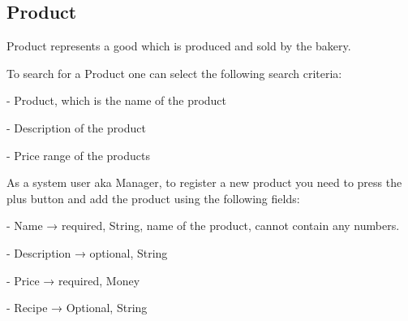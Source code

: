 \subsection{Product}

Product represents a good which is produced and sold by the bakery.

To search for a Product one can select the following search criteria:

- Product, which is the name of the product

- Description of the product

- Price range of the products


As a system user aka Manager, to register a new product you need to press the plus button and add the product using the following fields:

- Name → required, String, name of the product, cannot contain any numbers.

- Description → optional, String

- Price → required, Money

- Recipe → Optional, String


